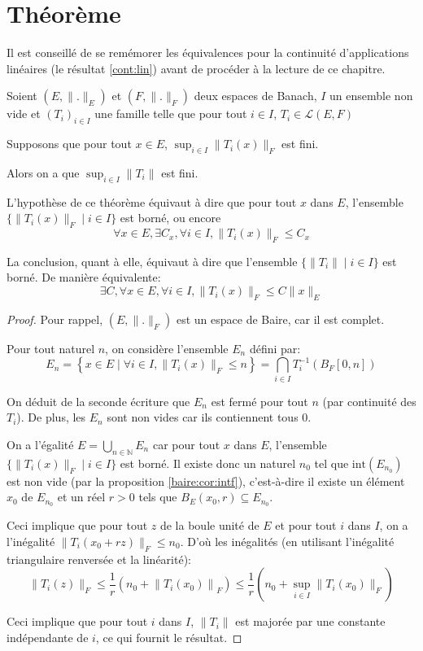 \section{Théorème}

Il est conseillé de se remémorer les équivalences pour
la continuité d'applications linéaires (le résultat
\ref{cont:lin}) avant de procéder à la lecture de ce
chapitre.


\begin{thm}
  Soient $(E, \|.\|_E)$ et $(F, \|.\|_F)$ deux espaces de Banach,
  $I$ un ensemble non vide et $(T_i)_{i\in I}$ une famille telle que
  pour tout $i\in I$, $T_i\in \mathscr{L}(E, F)$

  Supposons que pour tout $x\in E$, $\sup_{i\in I}\|T_i(x)\|_F$ est fini.

  Alors on a que $\sup_{i\in I}\|T_i\|$ est fini.
\end{thm}

L'hypothèse de ce théorème équivaut à dire que pour tout $x$ dans $E$,
l'ensemble $\{\|T_i(x)\|_F\mid i\in I\}$ est borné, ou encore
$$\forall x\in E, \exists C_x, \forall i\in I, \|T_i(x)\|_F \leq C_x$$

La conclusion, quant à elle, équivaut à dire que l'ensemble
$\{\|T_i\|\mid i\in I\}$ est borné. De manière équivalente:
$$\exists C, \forall x\in E, \forall i\in I, \|T_i(x)\|_F\leq C\|x\|_E$$

\begin{proof}
  Pour rappel, $(E, \|.\|_F)$ est un espace de Baire, car il est complet.

  Pour tout naturel $n$, on considère l'ensemble $E_n$ défini par:
  $$E_n = \left\{x\in E\mid \forall i\in I, \|T_i(x)\|_F\leq n\right\}
  =\bigcap_{i\in I}T_i^{-1}(B_F[0, n])$$

  On déduit de la seconde écriture que $E_n$ est
  fermé pour tout $n$ (par continuité des $T_i$). De plus,
  les $E_n$ sont non vides car ils contiennent tous $0$.

  On a l'égalité $E = \bigcup_{n\in\mathbb N}E_n$ car pour tout
  $x$ dans $E$, l'ensemble $\{\|T_i(x)\|_F\mid i\in I\}$ est borné.
  Il existe donc un naturel $n_0$ tel que $\mathrm{int}(E_{n_0})$
  est non vide (par la proposition \ref{baire:cor:intf}),
  c'est-à-dire il existe
  un élément $x_0$ de $E_{n_0}$ et un réel $r>0$ tels que $B_E(x_0, r)
  \subseteq E_{n_0}$.

  Ceci implique que pour tout $z$ de la boule unité de $E$ et
  pour tout $i$ dans $I$, on a l'inégalité
  $\|T_i(x_0 + r z)\|_F\leq n_0$. D'où les inégalités (en utilisant
  l'inégalité triangulaire renversée et la linéarité):
  $$\|T_i(z)\|_F \leq \frac 1 r \left( n_0 + \left\|T_i (x_0)\right\|_F \right) \leq
  \frac{1}{r} \left( n_0 + \sup_{i\in I}\|T_i(x_0)\|_F \right)$$

  Ceci implique que pour tout $i$ dans $I$, $\|T_i\|$ est
  majorée par une constante indépendante de $i$, ce qui
  fournit le résultat.

\end{proof}

